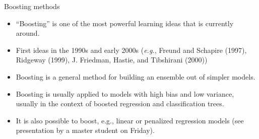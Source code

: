 \documentclass[
  10pt,
  ignorenonframetext,
]{beamer}
\providecommand{\tightlist}{%
  \setlength{\itemsep}{0pt}\setlength{\parskip}{0pt}}
\begin{document}
\begin{frame}
\begin{block}{Boosting methods}
\protect\hypertarget{boosting-methods}{}
\(~\)

\begin{itemize}
\tightlist
\item
  ``Boosting'' is one of the most powerful learning ideas that is
  currently around.
\end{itemize}

\vspace{2mm}

\begin{itemize}
\tightlist
\item
  First ideas in the 1990s and early 2000s (\emph{e.g.}, Freund and
  Schapire (1997), Ridgeway (1999), J. Friedman, Hastie, and Tibshirani
  (2000))
\end{itemize}

\vspace{2mm}

\begin{itemize}
\tightlist
\item
  Boosting is a general method for building an ensemble out of simpler
  models.
\end{itemize}

\vspace{2mm}

\begin{itemize}
\tightlist
\item
  Boosting is usually applied to models with high bias and low variance,
  usually in the context of boosted regression and classification trees.
\end{itemize}

\vspace{2mm}

\begin{itemize}
\tightlist
\item
  It is also possible to boost, e.g., linear or penalized regression
  models (see presentation by a master student on Friday).
\end{itemize}
\end{block}
\end{frame}
\end{document}
